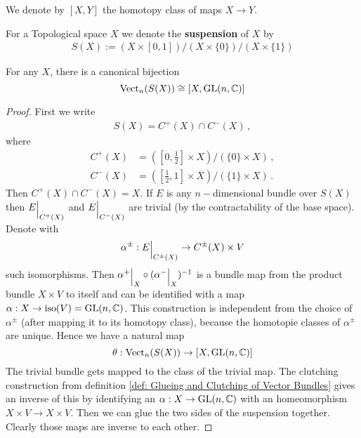 \begin{definition}
	We denote by $[X,Y]$ the homotopy class of maps $X\to Y$.
\end{definition}
\begin{definition}
	For a Topological space $X$ we denote the \textbf{suspension} of $X$ by 
	\begin{align*}
		S(X):= (X \times [0,1])\slash (X\times \{0\})\big/ ( X\times \{1\})
	\end{align*}
\end{definition}
\begin{lemma} \label{lem: Vect n cong GLnC}
	For any $X$, there is a canonical bijection
	\begin{equation*}
		\operatorname{\mathrm{Vect}}_n(S(X))\cong [X,\mathrm{GL}(n,\mathbb{C})]
	\end{equation*}
\end{lemma}
\begin{proof}
	First we write 
	\begin{align*}
		S(X)=C^+(X)\cap C^-(X)\, ,
	\end{align*}where
	\begin{align*}
		C^+(X)&=([0,\frac{1}{2}]\times X)\slash (\{0\}\times X) \, ,\\
		C^-(X)&=([\frac{1}{2},1]\times X)\slash (\{1\}\times X)\, .
	\end{align*} Then $C^+(X)\cap C^-(X)=X$. If $E$ is any $n-$dimensional bundle over $S(X)$ then ${E}\einsch{C^+(X)}$ and ${E}\einsch{C^-(X)}$ are trivial (by the contractability of the base space). Denote with 
	\begin{equation*}
		\alpha^{\pm}:{E}\einsch{C^{\pm}(X)}\to C^{\pm}(X)\times V
	\end{equation*} such isomorphisms. Then ${\alpha^+}\einsch{X}\circ ({\alpha^-}\einsch{X})^{-1}$ is a bundle map from the product bundle $X\times V$ to itself and can be identified with a map $\alpha : X\to \mathrm{iso}(V)=\mathrm{GL}(n,\mathbb{C})$.
	This construction is independent from the choice of $\alpha^{\pm}$ (after mapping it to its homotopy class), because the homotopie classes of $\alpha^{\pm}$ are unique.
	Hence we have a natural map 
	\begin{equation*}
		\theta: \operatorname{\mathrm{Vect}}_n(S(X))\to [X,\mathrm{GL}(n,\mathbb{C})]
	\end{equation*} The trivial bundle gets mapped to the class of the trivial map. 
	The clutching construction from definition \ref{def: Glueing and Clutching of Vector Bundles} gives an inverse of this by identifying an $\alpha:X \to \mathrm{GL}(n,\mathbb{C})$ with an homeomorphism $X\times V \to X\times V$. Then we can glue the two sides of the suspension together. Clearly those maps are inverse to each other.
\end{proof}

